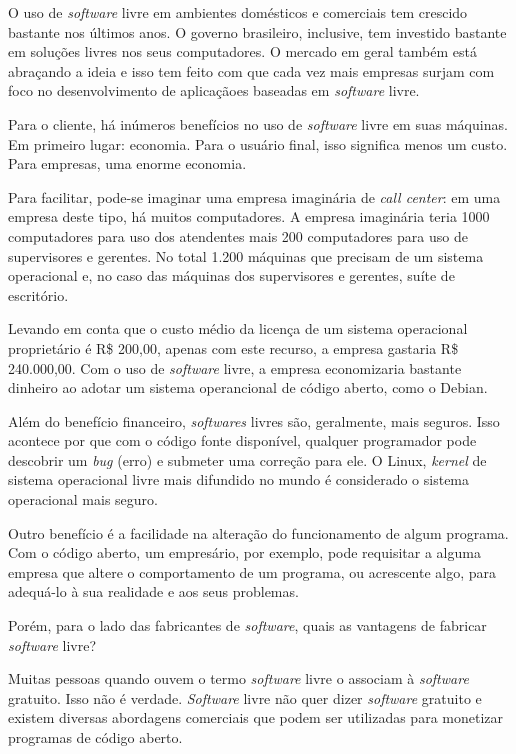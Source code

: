 \documentclass{classe_cn}                 %
\begin{document}
O uso de \textit{software} livre em ambientes domésticos e comerciais tem crescido bastante nos últimos anos. O governo brasileiro, inclusive, tem investido bastante em soluções livres nos seus computadores. O mercado em geral também está abraçando a ideia e isso tem feito com que cada vez mais empresas surjam com foco no desenvolvimento de aplicaçãoes baseadas em \textit{software} livre.

Para o cliente, há inúmeros benefícios no uso de \textit{software} livre em suas máquinas. Em primeiro lugar: economia. Para o usuário final, isso significa menos um custo. Para empresas, uma enorme economia.

Para facilitar, pode-se imaginar uma empresa imaginária de \textit{call center}: em uma empresa deste tipo, há muitos computadores. A empresa imaginária teria 1000 computadores para uso dos atendentes mais 200 computadores para uso de supervisores e gerentes. No total 1.200 máquinas que precisam de um sistema operacional e, no caso das máquinas dos supervisores e gerentes, suíte de escritório.

Levando em conta que o custo médio da licença de um sistema operacional proprietário é R\$ 200,00, apenas com este recurso, a empresa gastaria R\$ 240.000,00. Com o uso de \textit{software} livre, a empresa economizaria bastante dinheiro ao adotar um sistema operancional de código aberto, como o Debian.

Além do benefício financeiro, \textit{softwares} livres são, geralmente, mais seguros. Isso acontece por que com o código fonte disponível, qualquer programador pode descobrir um \textit{bug} (erro) e submeter uma correção para ele. O Linux, \textit{kernel} de sistema operacional livre mais difundido no mundo é considerado o sistema operacional mais seguro.

Outro benefício é a facilidade na alteração do funcionamento de algum programa. Com o código aberto, um empresário, por exemplo, pode requisitar a alguma empresa que altere o comportamento de um programa, ou acrescente algo, para adequá-lo à sua realidade e aos seus problemas.

Porém, para o lado das fabricantes de \textit{software}, quais as vantagens de fabricar \textit{software} livre?

Muitas pessoas quando ouvem o termo \textit{software} livre o associam à \textit{software} gratuito. Isso não é verdade. \textit{Software} livre não quer dizer \textit{software} gratuito e existem diversas abordagens comerciais que podem ser utilizadas para monetizar programas de código aberto.
\end{document}
